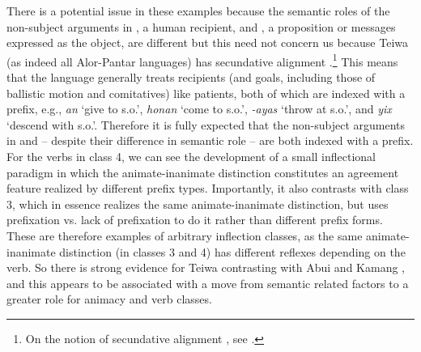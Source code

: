 There is a potential issue in these examples because the semantic roles of the non-subject arguments in , a human recipient, and , a proposition or messages expressed as the object, are different but this need not concern us because Teiwa  (as indeed all Alor-Pantar languages) has secundative alignment \citep[449,454]{Klamer2010ditransitive}.\footnote{On the notion of secundative alignment , see \citet{Dryer1986}.} This means that the language generally treats recipients (and goals, including those of ballistic motion and comitatives) like patients, both of which are indexed with a prefix, e.g., \textit{an} `give to s.o.', \textit{honan} `come to s.o.', \textit{{}-ayas} `throw at s.o.', and \textit{yix} `descend with s.o.'. Therefore it is fully expected that the non-subject arguments in  and  -- despite their difference in semantic role -- are both indexed with a prefix. For the verbs in class 4, we can see the development of a small inflectional paradigm in which the animate-inanimate distinction constitutes an agreement  feature realized by different prefix types. Importantly, it also contrasts with class 3, which in essence realizes the same animate-inanimate  distinction, but uses prefixation vs. lack of prefixation to do it rather than different prefix forms. These are therefore examples of arbitrary inflection classes, as the same animate-inanimate distinction (in classes 3 and 4) has different reflexes depending on the verb. So there is strong evidence for Teiwa  contrasting with Abui  and Kamang , and this appears to be associated with a move from semantic related factors to a greater role for animacy and verb classes. 

